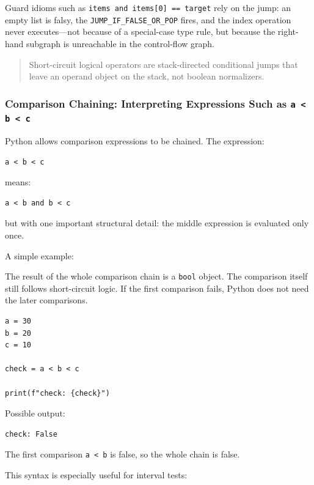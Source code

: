 Guard idioms such as \texttt{items and items[0] == target} rely on the jump: an empty list is falsy, the \texttt{JUMP\_IF\_FALSE\_OR\_POP} fires, and the index operation never executes---not because of a special-case type rule, but because the right-hand subgraph is unreachable in the control-flow graph.

\begin{quote}
Short-circuit logical operators are stack-directed conditional jumps that leave an operand object on the stack, not boolean normalizers.
\end{quote}

\subsubsection{Comparison Chaining: Interpreting Expressions Such as \texttt{a < b < c}}

Python allows comparison expressions to be chained. The expression:

\begin{verbatim}
a < b < c
\end{verbatim}

means:

\begin{verbatim}
a < b and b < c
\end{verbatim}

but with one important structural detail: the middle expression is evaluated only once.

A simple example:

The result of the whole comparison chain is a \texttt{bool} object. The comparison itself still follows short-circuit logic. If the first comparison fails, Python does not need the later comparisons.

\begin{verbatim}
a = 30
b = 20
c = 10

check = a < b < c

print(f"check: {check}")
\end{verbatim}

Possible output:

\begin{verbatim}
check: False
\end{verbatim}

The first comparison \texttt{a < b} is false, so the whole chain is false.

This syntax is especially useful for interval tests:

